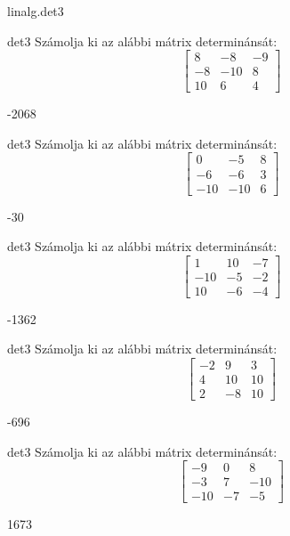 \documentclass[12pt]{article}
\begin{document}
\begin{quiz}{linalg.det3}
\begin{numerical}{det3}
Számolja ki az alábbi mátrix determinánsát:
$$\left[\begin{array}{ccc}8& -8& -9\\ -8& -10& 8\\ 10& 6& 4\end{array}\right]$$

\item -2068
\end{numerical}


\begin{numerical}{det3}
Számolja ki az alábbi mátrix determinánsát:
$$\left[\begin{array}{ccc}0& -5& 8\\ -6& -6& 3\\ -10& -10& 6\end{array}\right]$$

\item -30
\end{numerical}


\begin{numerical}{det3}
Számolja ki az alábbi mátrix determinánsát:
$$\left[\begin{array}{ccc}1& 10& -7\\ -10& -5& -2\\ 10& -6& -4\end{array}\right]$$

\item -1362
\end{numerical}


\begin{numerical}{det3}
Számolja ki az alábbi mátrix determinánsát:
$$\left[\begin{array}{ccc}-2& 9& 3\\ 4& 10& 10\\ 2& -8& 10\end{array}\right]$$

\item -696
\end{numerical}


\begin{numerical}{det3}
Számolja ki az alábbi mátrix determinánsát:
$$\left[\begin{array}{ccc}-9& 0& 8\\ -3& 7& -10\\ -10& -7& -5\end{array}\right]$$

\item 1673
\end{numerical}



\end{quiz}
\end{document}
